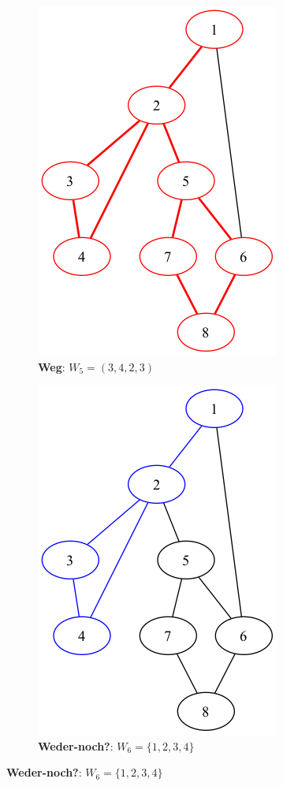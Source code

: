 \documentclass[a4paper,11pt]{report}
\begin{document}
\begin{figure}[htbp]
    \vspace{1em}
    \begin{subfigure}[b]{0.45\textwidth}
        \includegraphics[height=0.3\textheight]{notebook/assets/aufgabe_03_walk_5.png}
        \caption{\textbf{Weg}: $W_5 = (3, 4, 2, 3)$}
        \label{fig:w_5}
    \end{subfigure}
    \hfill
    \begin{subfigure}[b]{0.45\textwidth}
        \includegraphics[height=0.3\textheight]{notebook/assets/aufgabe_03_walk_6.png}
        \caption{\textbf{Weder-noch?}: $W_6 = \{ 1, 2, 3, 4\}$}
        \label{fig:w_6}
    \end{subfigure}
    \hfill
\end{figure}
\end{document}
